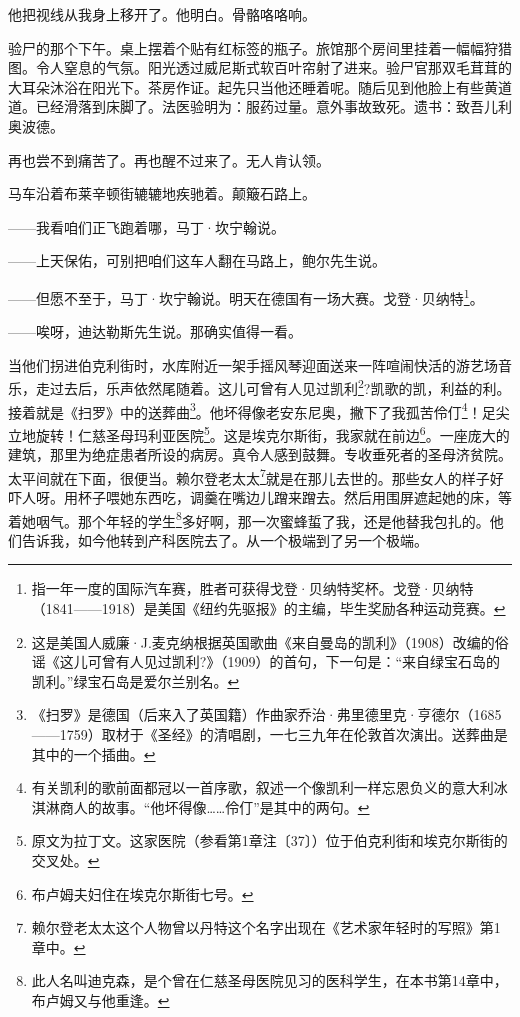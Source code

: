 \par 他把视线从我身上移开了。他明白。骨骼咯咯响。
\par 验尸的那个下午。桌上摆着个贴有红标签的瓶子。旅馆那个房间里挂着一幅幅狩猎图。令人窒息的气氛。阳光透过威尼斯式软百叶帘射了进来。验尸官那双毛茸茸的大耳朵沐浴在阳光下。茶房作证。起先只当他还睡着呢。随后见到他脸上有些黄道道。已经滑落到床脚了。法医验明为：服药过量。意外事故致死。遗书：致吾儿利奥波德。
\par 再也尝不到痛苦了。再也醒不过来了。无人肯认领。
\par 马车沿着布莱辛顿街辘辘地疾驰着。颠簸石路上。
\par ——我看咱们正飞跑着哪，马丁·坎宁翰说。
\par ——上天保佑，可别把咱们这车人翻在马路上，鲍尔先生说。
\par ——但愿不至于，马丁·坎宁翰说。明天在德国有一场大赛。戈登·贝纳特\footnote{指一年一度的国际汽车赛，胜者可获得戈登·贝纳特奖杯。戈登·贝纳特（1841——1918）是美国《纽约先驱报》的主编，毕生奖励各种运动竞赛。}。
\par ——唉呀，迪达勒斯先生说。那确实值得一看。
\par 当他们拐进伯克利街时，水库附近一架手摇风琴迎面送来一阵喧闹快活的游艺场音乐，走过去后，乐声依然尾随着。这儿可曾有人见过凯利\footnote{这是美国人威廉·J.麦克纳根据英国歌曲《来自曼岛的凯利》（1908）改编的俗谣《这儿可曾有人见过凯利?》（1909）的首句，下一句是：“来自绿宝石岛的凯利。”绿宝石岛是爱尔兰别名。}?凯歌的凯，利益的利。接着就是《扫罗》中的送葬曲\footnote{《扫罗》是德国（后来入了英国籍）作曲家乔治·弗里德里克·亨德尔（1685——1759）取材于《圣经》的清唱剧，一七三九年在伦敦首次演出。送葬曲是其中的一个插曲。}。他坏得像老安东尼奥，撇下了我孤苦伶仃\footnote{有关凯利的歌前面都冠以一首序歌，叙述一个像凯利一样忘恩负义的意大利冰淇淋商人的故事。“他坏得像……伶仃”是其中的两句。}！足尖立地旋转！仁慈圣母玛利亚医院\footnote{原文为拉丁文。这家医院（参看第1章注〔37〕）位于伯克利街和埃克尔斯街的交叉处。}。这是埃克尔斯街，我家就在前边\footnote{布卢姆夫妇住在埃克尔斯街七号。}。一座庞大的建筑，那里为绝症患者所设的病房。真令人感到鼓舞。专收垂死者的圣母济贫院。太平间就在下面，很便当。赖尔登老太太\footnote{赖尔登老太太这个人物曾以丹特这个名字出现在《艺术家年轻时的写照》第1章中。}就是在那儿去世的。那些女人的样子好吓人呀。用杯子喂她东西吃，调羹在嘴边儿蹭来蹭去。然后用围屏遮起她的床，等着她咽气。那个年轻的学生\footnote{此人名叫迪克森，是个曾在仁慈圣母医院见习的医科学生，在本书第14章中，布卢姆又与他重逢。}多好啊，那一次蜜蜂蜇了我，还是他替我包扎的。他们告诉我，如今他转到产科医院去了。从一个极端到了另一个极端。
